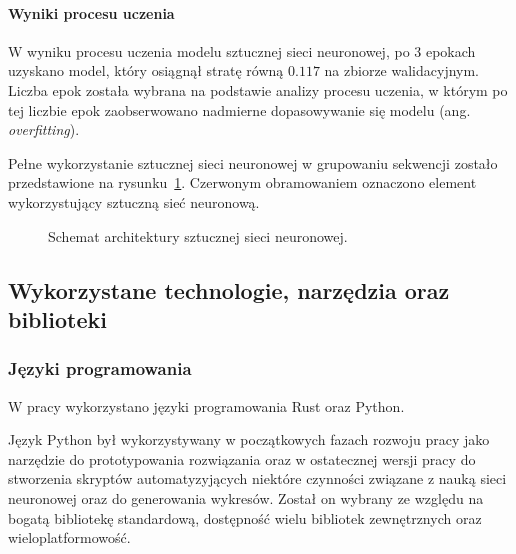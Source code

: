             \paragraph{Wyniki procesu uczenia}
                
                W wyniku procesu uczenia modelu sztucznej sieci neuronowej, po 3 epokach uzyskano model, który osiągnął stratę równą $0.117$ na zbiorze walidacyjnym. Liczba epok została wybrana na podstawie analizy procesu uczenia, w którym po tej liczbie epok zaobserwowano nadmierne dopasowywanie się modelu (ang. \textit{overfitting}).


            Pełne wykorzystanie sztucznej sieci neuronowej w grupowaniu sekwencji zostało przedstawione na rysunku~\ref{Picture:Cluster:Neural}. Czerwonym obramowaniem oznaczono element wykorzystujący sztuczną sieć neuronową.

            \begin{figure}
                \begin{center}
                    
                \end{center}
                \caption{
                    Schemat architektury sztucznej sieci neuronowej.
                }\label{Picture:Cluster:Neural}
            \end{figure}

    \subsection{Wykorzystane technologie, narzędzia oraz biblioteki}

        \subsubsection{Języki programowania}

            W pracy wykorzystano języki programowania Rust\cite{Rust} oraz Python\cite{Python}.
            
            Język Python był wykorzystywany w początkowych fazach rozwoju pracy jako narzędzie do prototypowania rozwiązania oraz w ostatecznej wersji pracy do stworzenia skryptów automatyzyjących niektóre czynności związane z nauką sieci neuronowej oraz do generowania wykresów. Został on wybrany ze względu na bogatą bibliotekę standardową, dostępność wielu bibliotek zewnętrznych oraz wieloplatformowość.
            
